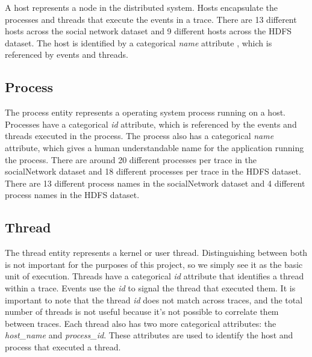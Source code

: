 A host represents a node in the distributed system. Hosts encapsulate the processes and threads
that execute the events in a trace. There are 13 different hosts across the social network dataset
and 9 different hosts across the HDFS dataset. The host is identified by a categorical \textit{name} attribute , which is
referenced by events and threads.

\subsection{Process}

The process entity represents a operating system process running on
a host. Processes have a categorical \textit{id} attribute, which is referenced by the events and threads executed in
the process. The process also has a categorical \textit{name} attribute, which gives a human understandable name for the
application running the process. There are around 20 different processes per trace in the socialNetwork
dataset and 18 different processes per trace in the HDFS dataset. There are 13 different process names
in the socialNetwork dataset and 4 different process names in the HDFS dataset.

\subsection{Thread}

The thread entity represents
a kernel or user thread. Distinguishing between both is not important for the purposes of this project, so we
simply see it as the basic unit of execution. Threads have a categorical \textit{id} attribute that identifies a thread
within a trace. Events use the \textit{id} to signal the thread that executed them. It is important to note
that the thread \textit{id} does not match across traces, and the total number of threads is not useful because it's
not possible to correlate them between traces. Each thread also has two more categorical attributes: the \textit{host\_name}
and \textit{process\_id}. These attributes are used to identify the host and process that executed a thread. 